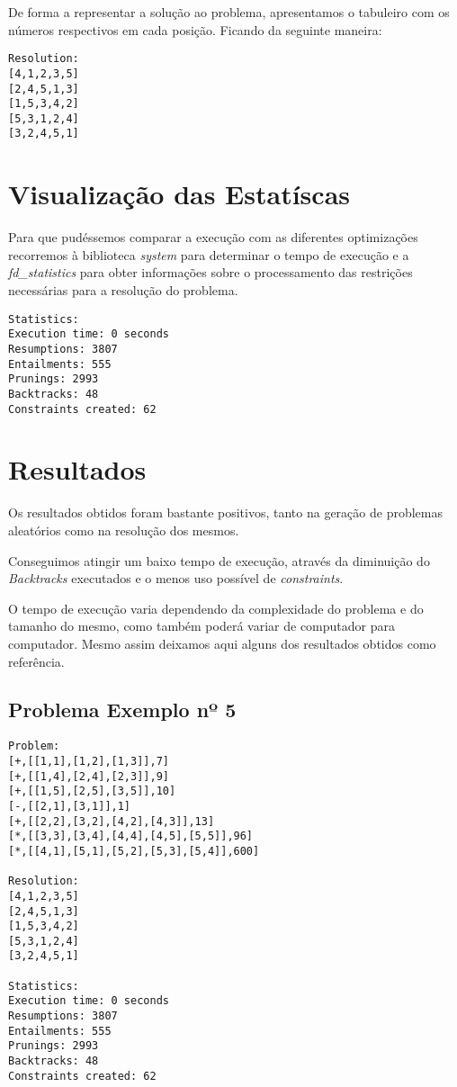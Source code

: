\documentclass[runningheads,a4paper]{llncs}
\begin{document}
De forma a representar a solução ao problema, apresentamos o tabuleiro com os números respectivos em cada posição. Ficando da seguinte maneira:

\begin{lstlisting}
Resolution:
[4,1,2,3,5]
[2,4,5,1,3]
[1,5,3,4,2]
[5,3,1,2,4]
[3,2,4,5,1]
\end{lstlisting}


\section{Visualização das Estatíscas}

Para que pudéssemos comparar a execução com as diferentes optimizações recorremos à biblioteca \textit{system} para determinar o tempo de execução e a \textit{fd\_statistics} para obter informações sobre o processamento das restrições necessárias para a resolução do problema.


\begin{lstlisting}
Statistics:
Execution time: 0 seconds
Resumptions: 3807
Entailments: 555
Prunings: 2993
Backtracks: 48
Constraints created: 62
\end{lstlisting}


\section{Resultados}

Os resultados obtidos foram bastante positivos, tanto na geração de problemas aleatórios como na resolução dos mesmos.

Conseguimos atingir um baixo tempo de execução, através da diminuição do \textit{Backtracks} executados e o menos uso possível de \textit{constraints}.

O tempo de execução varia dependendo da complexidade do problema e do tamanho do mesmo, como também poderá variar de computador para computador. Mesmo assim deixamos aqui alguns dos resultados obtidos como referência.

\subsection{Problema Exemplo nº 5}
\begin{lstlisting}
Problem:
[+,[[1,1],[1,2],[1,3]],7]
[+,[[1,4],[2,4],[2,3]],9]
[+,[[1,5],[2,5],[3,5]],10]
[-,[[2,1],[3,1]],1]
[+,[[2,2],[3,2],[4,2],[4,3]],13]
[*,[[3,3],[3,4],[4,4],[4,5],[5,5]],96]
[*,[[4,1],[5,1],[5,2],[5,3],[5,4]],600]

Resolution:
[4,1,2,3,5]
[2,4,5,1,3]
[1,5,3,4,2]
[5,3,1,2,4]
[3,2,4,5,1]

Statistics:
Execution time: 0 seconds
Resumptions: 3807
Entailments: 555
Prunings: 2993
Backtracks: 48
Constraints created: 62
\end{lstlisting}
\end{document}
